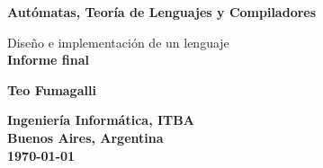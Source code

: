 \begin{titlepage}
  \begin{center}
    \vspace*{1cm}
    \textbf{Autómatas, Teoría de Lenguajes y Compiladores}

    \vspace{1cm}
    \large{Diseño e implementación de un lenguaje}\\
    \Large\textbf{Informe final}

    \vspace{1cm}
    \large\textbf{Teo Fumagalli}

    \vfill

    \normalsize
    \textbf{Ingeniería Informática, ITBA}\\
    \textbf{Buenos Aires, Argentina}\\
    \textbf{\today}
    \vspace*{1cm}

  \end{center}
\end{titlepage}

